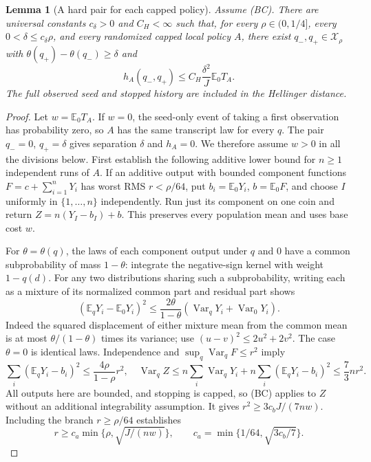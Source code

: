 \documentclass[11pt]{article}
\newtheorem{lemma}[theorem]{Lemma}
\newcommand{\E}{\mathbb E}
\newcommand{\Var}{\operatorname{Var}}
\begin{document}
\begin{lemma}[A hard pair for each capped policy]\label{lem:hard-pair}
Assume (BC). There are universal constants $c_\delta>0$ and $C_H<\infty$
such that, for every $\rho\in(0,1/4]$, every
$0<\delta\le c_\delta\rho$, and every randomized capped local policy $A$,
there exist $q_-,q_+\in\mathcal X_\rho$ with
$\theta(q_+)-\theta(q_-)\ge\delta$ and
\[
 h_A(q_-,q_+)\le C_H\frac{\delta^2}{J}\E_0T_A.              \tag{6}
\]
The full observed seed and stopped history are included in the Hellinger
distance.
\end{lemma}
\begin{proof}
Let $w=\E_0T_A$. If $w=0$, the seed-only event of taking a first observation
has probability zero, so $A$ has the same transcript law for every $q$.
The pair $q_-=0$, $q_+=\delta$ gives separation $\delta$ and $h_A=0$.
We therefore assume $w>0$ in all the divisions below.
First establish the following additive lower bound for
$n\ge1$ independent runs of $A$. If an additive output with bounded
component functions
$F=c+\sum_{i=1}^nY_i$ has worst RMS $r<\rho/64$, put
$b_i=\E_0Y_i$, $b=\E_0F$, and choose $I$ uniformly in $\{1,\ldots,n\}$
independently. Run just its component on one coin and return
$Z=n(Y_I-b_I)+b$. This preserves every population mean and uses base cost
$w$.

For $\theta=\theta(q)$, the laws of each component output under $q$ and
$0$ have a common subprobability of mass $1-\theta$: integrate the
negative-sign kernel with weight $1-q(d)$. For any two distributions
sharing such a subprobability, writing each as a mixture of its normalized
common part and residual part shows
\[
 (\E_qY_i-\E_0Y_i)^2
 \le\frac{2\theta}{1-\theta}
       (\Var_qY_i+\Var_0Y_i).                              \tag{7}
\]
Indeed the squared displacement of either mixture mean from the common
mean is at most $\theta/(1-\theta)$ times its variance; use
$(u-v)^2\le2u^2+2v^2$. The case $\theta=0$ is identical laws.
Independence and $\sup_q\Var_qF\le r^2$ imply
\[
 \sum_i(\E_qY_i-b_i)^2\le\frac{4\rho}{1-\rho}r^2,
 \quad
 \Var_qZ\le n\sum_i\Var_qY_i
                 +n\sum_i(\E_qY_i-b_i)^2
              \le\frac73nr^2.
\]
All outputs here are bounded, and stopping is capped, so (BC) applies to
$Z$ without an additional integrability assumption. It gives
$r^2\ge3c_bJ/(7nw)$. Including the branch $r\ge\rho/64$ establishes
\[
 r\ge c_a\min\{\rho,\sqrt{J/(nw)}\},\qquad
 c_a=\min\{1/64,\sqrt{3c_b/7}\}.                           \tag{8}
\]


\end{proof}
\end{document}

